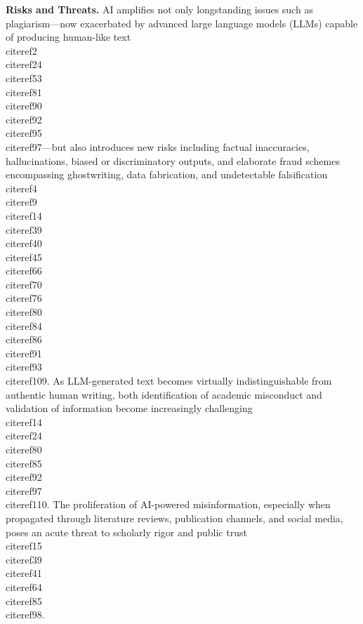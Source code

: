 \documentclass[11pt]{article}
\begin{document}
\textbf{Risks and Threats.}  
AI amplifies not only longstanding issues such as plagiarism—now exacerbated by advanced large language models (LLMs) capable of producing human-like text \\cite{ref2}\\cite{ref24}\\cite{ref53}\\cite{ref81}\\cite{ref90}\\cite{ref92}\\cite{ref95}\\cite{ref97}—but also introduces new risks including factual inaccuracies, hallucinations, biased or discriminatory outputs, and elaborate fraud schemes encompassing ghostwriting, data fabrication, and undetectable falsification \\cite{ref4}\\cite{ref9}\\cite{ref14}\\cite{ref39}\\cite{ref40}\\cite{ref45}\\cite{ref66}\\cite{ref70}\\cite{ref76}\\cite{ref80}\\cite{ref84}\\cite{ref86}\\cite{ref91}\\cite{ref93}\\cite{ref109}. As LLM-generated text becomes virtually indistinguishable from authentic human writing, both identification of academic misconduct and validation of information become increasingly challenging \\cite{ref14}\\cite{ref24}\\cite{ref80}\\cite{ref85}\\cite{ref92}\\cite{ref97}\\cite{ref110}. The proliferation of AI-powered misinformation, especially when propagated through literature reviews, publication channels, and social media, poses an acute threat to scholarly rigor and public trust \\cite{ref15}\\cite{ref39}\\cite{ref41}\\cite{ref64}\\cite{ref85}\\cite{ref98}.
\end{document}
